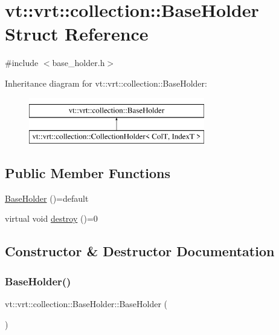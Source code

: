 \hypertarget{structvt_1_1vrt_1_1collection_1_1_base_holder}{}\section{vt\+:\+:vrt\+:\+:collection\+:\+:Base\+Holder Struct Reference}
\label{structvt_1_1vrt_1_1collection_1_1_base_holder}


{\ttfamily \#include $<$base\+\_\+holder.\+h$>$}

Inheritance diagram for vt\+:\+:vrt\+:\+:collection\+:\+:Base\+Holder\+:\begin{figure}[H]
\begin{center}
\leavevmode
\includegraphics[height=2.000000cm]{structvt_1_1vrt_1_1collection_1_1_base_holder}
\end{center}
\end{figure}
\subsection*{Public Member Functions}
\begin{DoxyCompactItemize}
\item 
\hyperlink{structvt_1_1vrt_1_1collection_1_1_base_holder_a748c42f9fcddba89eae7d55424080e4e}{Base\+Holder} ()=default
\item 
virtual void \hyperlink{structvt_1_1vrt_1_1collection_1_1_base_holder_a56c8289f60121e38f3699bcfafbbd491}{destroy} ()=0
\end{DoxyCompactItemize}


\subsection{Constructor \& Destructor Documentation}
\mbox{\label{structvt_1_1vrt_1_1collection_1_1_base_holder_a748c42f9fcddba89eae7d55424080e4e}} 
\subsubsection{\texorpdfstring{Base\+Holder()}{BaseHolder()}}
{\footnotesize\ttfamily vt\+::vrt\+::collection\+::\+Base\+Holder\+::\+Base\+Holder (\begin{DoxyParamCaption}{ }\end{DoxyParamCaption})\hspace{0.3cm}{\ttfamily [default]}}



